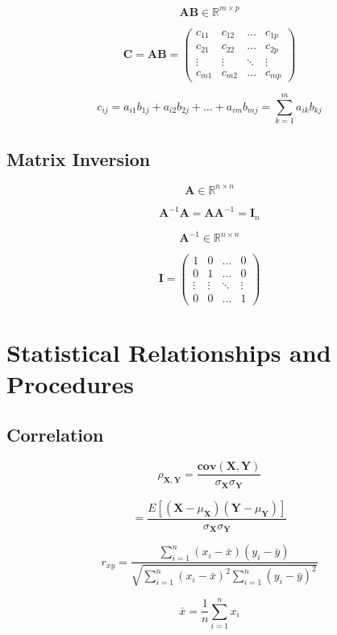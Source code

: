 \documentclass[a4paper]{article}
\begin{document}
$$ \mathbf{AB} \in \mathbb{R}^{m \times p} $$

$$ \mathbf{C} = \mathbf{AB} = 
\begin{pmatrix}
c_{11} & c_{12} & \ldots & c_{1p} \\
c_{21} & c_{22} & \ldots & c_{2p} \\
\vdots & \vdots & \ddots & \vdots \\
c_{m1} & c_{m2} & \ldots & c_{mp}
\end{pmatrix}
$$

$$ c_{ij} = a_{i1}b_{1j} + a_{i2}b_{2j} + \ldots + a_{im}b_{mj} = \sum_{k=1}^{m}a_{ik}b_{kj} $$

\subsection{Matrix Inversion}

$$ \mathbf{A} \in \mathbb{R}^{n \times n} $$

$$ \mathbf{A}^{-1}\mathbf{A} = \mathbf{AA}^{-1} = \mathbf{I}_n $$

$$ \mathbf{A}^{-1} \in \mathbb{R}^{n \times n} $$

$$ \mathbf{I} = 
\begin{pmatrix}
1 & 0 & \ldots & 0 \\
0 & 1 & \ldots & 0 \\
\vdots & \vdots & \ddots & \vdots \\
0 & 0 & \ldots & 1
\end{pmatrix}
$$

\section{Statistical Relationships and Procedures}

\subsection{Correlation}

$$ \rho_{\mathbf{X}, \mathbf{Y}} = \frac{\mathbf{cov}(\mathbf{X}, \mathbf{Y})}{\sigma_{\mathbf{X}}\sigma_{\mathbf{Y}}} $$

$$ = \frac{E[(\mathbf{X}-\mu_{\mathbf{X}})(\mathbf{Y}-\mu_{\mathbf{Y}})]}{\sigma_{\mathbf{X}}\sigma_{\mathbf{Y}}} $$

$$ r_{xy} = \frac{\sum_{i=1}^{n}(x_i-\bar{x})(y_i-\bar{y})}
{\sqrt{
\sum_{i=1}^{n}(x_i-\bar{x})^2
\sum_{i=1}^{n}(y_i-\bar{y})^2
}} $$

$$ \bar{x} = \frac{1}{n}\sum_{i=1}^{n}x_i $$
\end{document}
